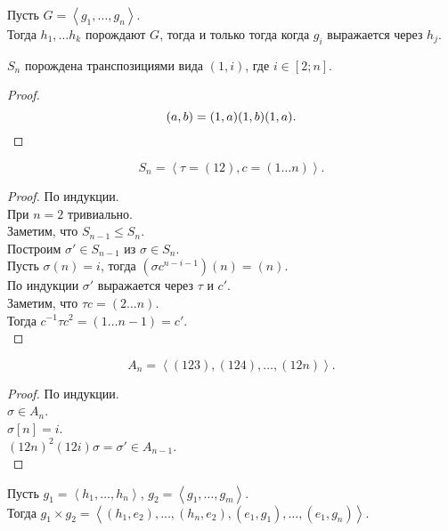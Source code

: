 \documentclass[11pt, oneside]{article}   	%
\begin{document}
    \begin{theorem}
        Пусть $G = \left<g_1, \ldots, g_n\right>$.\\
        Тогда $h_1, \ldots h_k$ порождают $G$, тогда и только тогда когда $g_i$ выражается через $h_j$.\\
    \end{theorem}
    \begin{theorem}
        $S_n$ порождена транспозициями вида $(1, i)$, где $i\in \left[2; n\right]$.\\
        \begin{proof}
            \[ (a, b) = (1, a)(1, b)(1, a) \qedhere.\] 
        \end{proof}
    \end{theorem}
    \begin{theorem}
        \[ S_n = \left<\tau = (12), c = (1\ldots n)\right> .\]
        \begin{proof}
            По индукции.\\
            При $n=2$ тривиально.\\
            Заметим, что $S_{n-1} \le S_n$.\\
            Построим $\sigma'\in S_{n-1}$ из $\sigma\in S_n$.\\
            Пусть $\sigma(n) = i$, тогда $(\sigma c^{n-i-1})(n) = (n)$.\\
            По индукции $\sigma'$ выражается через $\tau$ и $c'$.\\
            Заметим, что $\tau c = (2\ldots n)$.\\
            Тогда $c^{-1}\tau c^2 = (1 \ldots n-1) = c'$.\\
        \end{proof}
    \end{theorem}
    \begin{theorem}
        \[ A_n = \left<(123), (124), \ldots, (12n)\right> .\]
        \begin{proof}
            По индукции.\\
            $\sigma\in A_n$.\\
            $\sigma[n] = i$.\\
            $(12n)^2(12i)\sigma = \sigma'\in A_{n-1}$.\\
        \end{proof}
    \end{theorem}
    \begin{theorem}
        Пусть $g_1 = \left<h_1, \ldots, h_n\right>$, $g_2 = \left<g_1, \ldots, g_m\right>$.\\
        Тогда $g_1 \times g_2 = \left<(h_1, e_2), \ldots, (h_n, e_2), (e_1, g_1), \ldots, (e_1, g_n)\right>$.
    \end{theorem}
\end{document}
